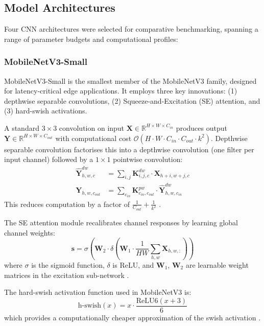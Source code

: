 \documentclass[pdflatex,sn-mathphys-num]{sn-jnl}
\theoremstyle{thmstyleone}%
\theoremstyle{thmstyletwo}%
\theoremstyle{thmstylethree}%
\begin{document}
\subsection{Model Architectures}
\label{sec:models}

Four CNN architectures were selected for comparative benchmarking, spanning a range of
parameter budgets and computational profiles:

\subsubsection{MobileNetV3-Small}

MobileNetV3-Small \citep{howard2019mobilenetv3} is the smallest member of the MobileNetV3
family, designed for latency-critical edge applications. It employs three key
innovations: (1) depthwise separable convolutions, (2) Squeeze-and-Excitation (SE)
attention, and (3) hard-swish activations.

A standard $3\times3$ convolution on input $\mathbf{X} \in \mathbb{R}^{H \times W \times C_{in}}$
produces output $\mathbf{Y} \in \mathbb{R}^{H \times W \times C_{out}}$ with computational
cost $\mathcal{O}(H \cdot W \cdot C_{in} \cdot C_{out} \cdot k^2)$. Depthwise separable
convolution factorises this into a depthwise convolution (one filter per input channel)
followed by a $1\times1$ pointwise convolution:
\begin{align}
  \hat{\mathbf{Y}}^{dw}_{h,w,c} &= \sum_{i,j} \mathbf{K}^{dw}_{i,j,c} \cdot \mathbf{X}_{h+i, w+j, c}
  \label{eq:dw_conv} \\
  \mathbf{Y}_{h,w,c_{out}} &= \sum_{c_{in}} \mathbf{K}^{pw}_{c_{in},c_{out}} \cdot
  \hat{\mathbf{Y}}^{dw}_{h,w,c_{in}}
  \label{eq:pw_conv}
\end{align}
This reduces computation by a factor of $\frac{1}{C_{out}} + \frac{1}{k^2}$
\citep{howard2017mobilenets}.

The SE attention module recalibrates channel responses by learning global channel weights:
\begin{equation}
  \mathbf{s} = \sigma\!\left( \mathbf{W}_2 \cdot \delta\!\left( \mathbf{W}_1 \cdot
  \frac{1}{HW}\sum_{h,w} \mathbf{X}_{h,w,:} \right) \right)
  \label{eq:se}
\end{equation}
where $\sigma$ is the sigmoid function, $\delta$ is ReLU, and $\mathbf{W}_1$,
$\mathbf{W}_2$ are learnable weight matrices in the excitation sub-network
\citep{hu2018squeeze}.

The hard-swish activation function used in MobileNetV3 is:
\begin{equation}
  \text{h-swish}(x) = x \cdot \frac{\text{ReLU6}(x + 3)}{6}
  \label{eq:hswish}
\end{equation}
which provides a computationally cheaper approximation of the swish activation
\citep{howard2019mobilenetv3}.
\end{document}
